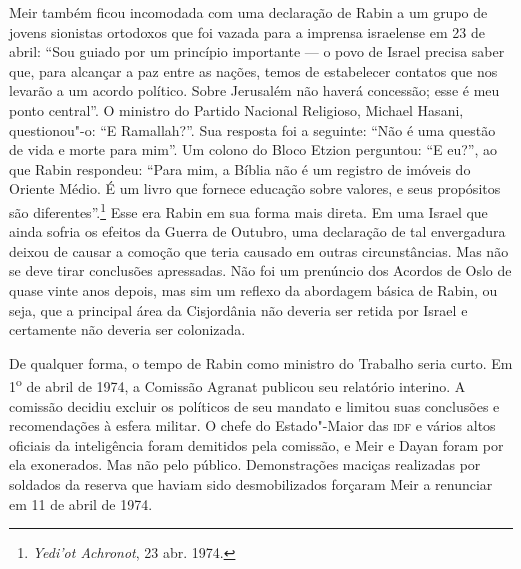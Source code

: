 Meir também ficou incomodada com uma declaração de Rabin a um grupo de
jovens sionistas ortodoxos que foi vazada para a imprensa israelense em
23 de abril: ``Sou guiado por um princípio importante --- o povo de
Israel precisa saber que, para alcançar a paz entre as nações, temos de
estabelecer contatos que nos levarão a um acordo político. Sobre
Jerusalém não haverá concessão; esse é meu ponto central''. O ministro do Partido Nacional Religioso, Michael Hasani, questionou"-o:
``E Ramallah?''. Sua resposta foi a seguinte: ``Não é uma questão de vida e morte para
mim''. Um colono do Bloco Etzion perguntou: ``E eu?'', ao que Rabin
respondeu: ``Para mim, a Bíblia não é um registro de imóveis do Oriente
Médio. É um livro que fornece educação sobre valores, e seus propósitos
são diferentes''.\footnote{\emph{Yedi'ot Achronot}, 23 abr. 1974.} Esse era Rabin em sua forma mais direta. Em
uma Israel que ainda sofria os efeitos da Guerra de Outubro, uma
declaração de tal envergadura deixou de causar a comoção que teria
causado em outras circunstâncias. Mas não se deve tirar conclusões
apressadas. Não foi um prenúncio dos Acordos de Oslo de quase vinte anos
depois, mas sim um reflexo da abordagem básica de Rabin, ou seja, que a
principal área da Cisjordânia não deveria ser retida por Israel e
certamente não deveria ser colonizada.

De qualquer forma, o tempo de Rabin como ministro do Trabalho seria
curto. Em 1\textsuperscript{o} de abril de 1974, a Comissão Agranat
publicou seu relatório interino. A comissão decidiu excluir os políticos
de seu mandato e limitou suas conclusões e recomendações à esfera
militar. O chefe do Estado"-Maior das \textsc{idf} e vários altos oficiais da
inteligência foram demitidos pela comissão, e Meir e Dayan foram por ela
exonerados. Mas não pelo público. Demonstrações maciças realizadas por
soldados da reserva que haviam sido desmobilizados forçaram Meir a
renunciar em 11 de abril de 1974.

